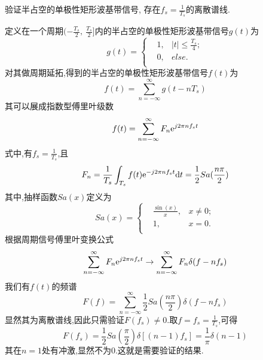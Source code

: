 验证半占空的单极性矩形波基带信号, 存在$f_s=\frac{1}{T_s}$的离散谱线.

\begin{solution}
    定义在一个周期$(-\frac{T_s}{2},\ \frac{T_s}{2}]$内的半占空的单极性矩形波基带信号$g(t)$为
    \begin{equation}
        g(t)=
        \left\{
        \begin{aligned}
             & 1, & \left\lvert t \right\rvert \leqslant \frac{T_s}{4}; \\
             & 0, & else.                                               \\
        \end{aligned}
        \right.
    \end{equation}
    对其做周期延拓,得到的半占空的单极性矩形波基带信号$f(t)$为
    \begin{equation}
        f(t)=\sum_{n = -\infty}^{\infty}g(t-nT_s)
    \end{equation}
    其可以展成指数型傅里叶级数
    \begin{equation}
        f(t)=\sum_{n = -\infty}^{\infty}F_n \mathrm{e} ^{j 2\pi n f_s t}
    \end{equation}
    式中,有$f_s=\frac{1}{T_s}$,且
    \begin{equation}
        F_n=\frac{1}{T_s}\int_{T_s} f(t) \mathrm{e} ^{-j 2\pi n f_s t } \mathrm{d}t=\frac{1}{2}Sa(\frac{n\pi}{2})
    \end{equation}
    其中,抽样函数$Sa(x)$定义为
    \begin{equation}
        Sa(x)=
        \left\{
        \begin{aligned}
             & \frac{\sin(x)}{x}, & x\neq 0; \\
             & 1,                 & x =0.    \\
        \end{aligned}
        \right.
    \end{equation}
    根据周期信号傅里叶变换公式
    \begin{equation}
        \sum_{n = -\infty}^{\infty}F_n \mathrm{e} ^{j 2\pi n f_s t} \rightarrow \sum_{n = -\infty}^{\infty}F_n\delta(f-nf_s)
    \end{equation}
    我们有$f(t)$的频谱
    \begin{equation}
        F(f)=\sum_{n=-\infty}^{\infty}\frac{1}{2}Sa(\frac{n\pi}{2})\delta(f-nf_s)
    \end{equation}
    显然其为离散谱线,因此只需验证$F(f_s)\neq 0$.取$f=f_s=\frac{1}{T_s}$,可得
    \begin{equation}
        F(f_s)=\frac{1}{2}Sa(\frac{\pi}{2})\delta[(n-1)f_s]=\frac{1}{\pi}\delta(n-1)
    \end{equation}
    其在$n=1$处有冲激,显然不为0.这就是需要验证的结果.
\end{solution}
